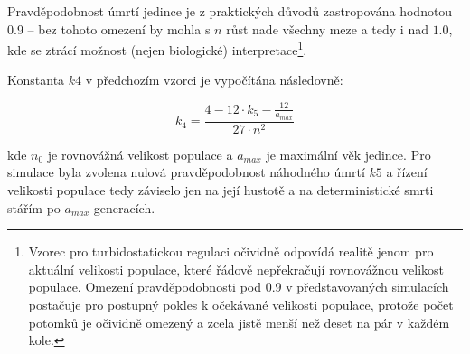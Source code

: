 Pravděpodobnost úmrtí jedince je z praktických důvodů zastropována hodnotou 0.9 --
bez tohoto omezení by mohla s $n$ růst nade všechny meze a tedy i nad $1.0$,
kde se ztrácí možnost (nejen biologické) interpretace\footnote{
Vzorec pro turbidostatickou regulaci očividně odpovídá realitě jenom pro aktuální velikosti populace,
které řádově nepřekračují rovnovážnou velikost populace. Omezení pravděpodobnosti pod $0.9$ v představovaných
simulacích postačuje pro postupný pokles k očekávané velikosti populace, protože počet potomků je očividně omezený a
zcela jistě menší než deset na pár v každém kole.
}.

Konstanta $k4$ v předchozím vzorci je vypočítána následovně:

\begin{equation}
k_4 = \frac{4 - 12\cdot{}{k_5} - \frac{12}{a_{max}}}
           {27\cdot{}n^2}
\end{equation}


kde $n_0$ je rovnovážná velikost populace a $a_{max}$ je maximální věk jedince.
Pro simulace byla zvolena nulová pravděpodobnost náhodného úmrtí $k5$ a řízení velikosti populace tedy záviselo jen na
její hustotě a na deterministické smrti stářím po $a_{max}$ generacích.

